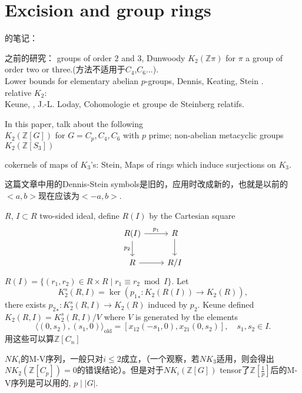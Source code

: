 \section{Excision and group rings}
\cite{STEIN1980213}的笔记：

之前的研究： groups of order $2$ and $3$, Dunwoody $K_2(\mathbb{Z}\pi)$ for $\pi$ a group of order two or three.(方法不适用于$C_4$,$C_6$...).\\
Lower bounds for elementary abelian $p$-groups, Dennis, Keating, Stein \cite{Stein1976}.\\
relative $K_2$:\\
Keune, \cite{Keune1978The}, J.-L. Loday, Cohomologie et groupe de Steinberg relatifs.

In this paper, talk about the following\\
$K_2(\mathbb{Z}[G])$ for $G=C_p,C_4,C_6$ with $p$ prime; non-abelian metacyclic groups $K_2(\mathbb{Z}[S_3])$

cokernels of maps of $K_3$'s: Stein, Maps of rings which induce surjections on $K_3$.

这篇文章中用的Dennis-Stein symbols是旧的，应用时改成新的，也就是以前的$<a,b>$现在应该为$<-a,b>$.

$R$, $I\subset R$ two-sided ideal, define $R(I)$ by the Cartesian square
\[
\begin{tikzcd}
	R(I) \ar[r,"p_1"] \ar[d,"p_2"'] &R\ar[d]\\
	R \ar[r] &R/I
\end{tikzcd}
\]
$R(I)=\{(r_1,r_2)\in R\times R \mid r_1 \equiv r_2 \bmod I\}$. Let
\[K_2^s(R,I)=\ker({p_1}_*\colon K_2(R(I))\longrightarrow K_2(R)),\]
there exists ${p_2}_*\colon K_2^s(R,I)\longrightarrow K_2(R)$ induced by $p_2$. Keune defined $K_2(R,I)=K_2^s(R,I)/V$ where $V$ is generated by the elements
\[\langle(0,s_2),(s_1,0) \rangle_{\text{old}}=[x_{12}(-s_1,0),x_{21}(0,s_2)],\quad s_1,s_2\in I.\]
用这些可以算$\mathbb{Z}[C_n]$

$NK_i$的M-V序列，一般只对$i\leq 2$成立，（一个观察，若$NK_3$适用，则会得出$NK_2(\mathbb{Z}[C_p])=0$的错误结论）。但是对于$NK_i(\mathbb{Z}[G])$ tensor了$\mathbb{Z}[\frac{1}{p}]$后的M-V序列是可以用的, $p\mid|G|$.
































